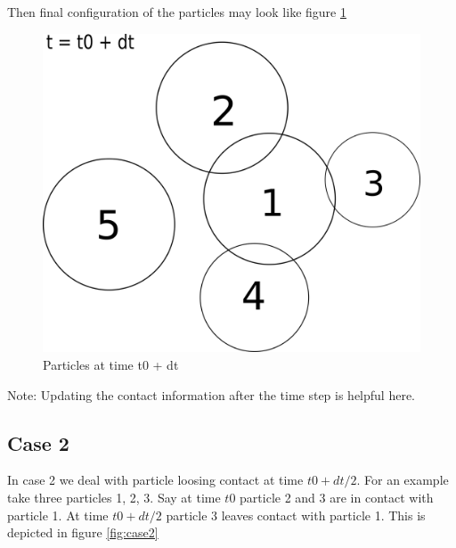 \documentclass[11pt]{article}
\begin{document}
Then final configuration of the particles may look like figure \ref{fig:case1_t0_dt}

\begin{figure}[H]
\centering
\includegraphics[scale=0.30]{dem_physics_figures/case1_t0_dt.png}
\caption{Particles at time t0 + dt\label{fig:case1_t0_dt}}
\end{figure}

Note: Updating the contact information after the time step is helpful here.

\subsection{Case 2}
\label{sec:org8bc9c9f}
In case 2 we deal with particle loosing contact at time \(t0 + dt/2\). For an
example take three particles 1, 2, 3. Say at time \(t0\) particle 2 and 3 are
in contact with particle 1. At time \(t0+dt/2\) particle 3 leaves contact with particle 1.
This is depicted in figure \ref{fig:case2}
\end{document}
